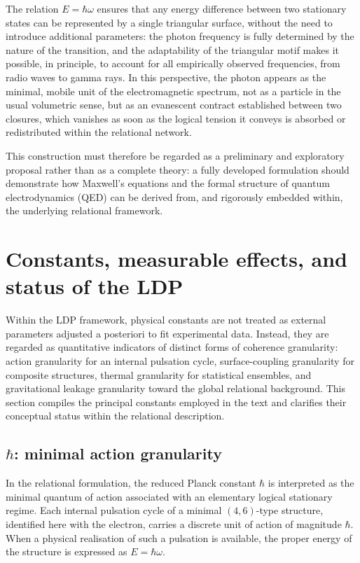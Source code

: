 \documentclass[11pt,a4paper]{article}
\begin{document}
The relation \(E = \hbar \omega\) ensures that any energy difference between two stationary states can be represented by a single triangular surface, without the need to introduce additional parameters: the photon frequency is fully determined by the nature of the transition, and the adaptability of the triangular motif makes it possible, in principle, to account for all empirically observed frequencies, from radio waves to gamma rays. In this perspective, the photon appears as the minimal, mobile unit of the electromagnetic spectrum, not as a particle in the usual volumetric sense, but as an evanescent contract established between two closures, which vanishes as soon as the logical tension it conveys is absorbed or redistributed within the relational network.

This construction must therefore be regarded as a preliminary and exploratory proposal rather than as a complete theory: a fully developed formulation should demonstrate how Maxwell’s equations and the formal structure of quantum electrodynamics (QED) can be derived from, and rigorously embedded within, the underlying relational framework.

\section{Constants, measurable effects, and status of the LDP}
Within the LDP framework, physical constants are not treated as external parameters adjusted a posteriori to fit experimental data. Instead, they are regarded as quantitative indicators of distinct forms of coherence granularity: action granularity for an internal pulsation cycle, surface-coupling granularity for composite structures, thermal granularity for statistical ensembles, and gravitational leakage granularity toward the global relational background. This section compiles the principal constants employed in the text and clarifies their conceptual status within the relational description. 

\subsection{\texorpdfstring{\(\hbar\)}{ħ}: minimal action granularity}
In the relational formulation, the reduced Planck constant \(\hbar\) is interpreted as the minimal quantum of action associated with an elementary logical stationary regime. Each internal pulsation cycle of a minimal \((4,6)\)-type structure, identified here with the electron, carries a discrete unit of action of magnitude \(\hbar\). When a physical realisation of such a pulsation is available, the proper energy of the structure is expressed as \(E = \hbar \omega\). 
\end{document}
